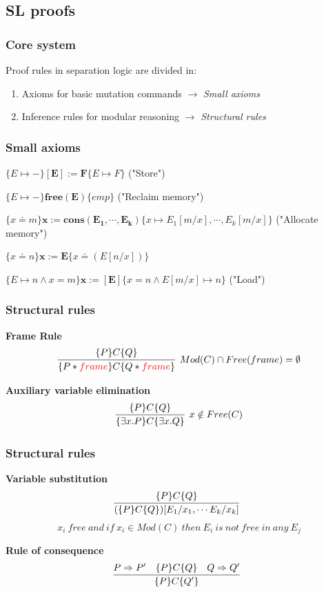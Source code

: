 \documentclass[professionalfont]{beamer}
\begin{document}
    \subsection{SL proofs}
        \begin{frame}
            \frametitle{Core system}
            Proof rules in separation logic  are divided in:\begin{enumerate}
                \item Axioms for basic mutation commands $\rightarrow$ \emph{Small axioms}
                \item Inference rules for modular reasoning $\rightarrow$ \emph{Structural rules}
            \end{enumerate}
        \end{frame}
        \begin{frame}
            \frametitle{Small axioms}
             
            \pause
            $\{E \mapsto - \}\mathbf{[E] := F}\{ E \mapsto F \} $ ("Store")
            
            \bigskip
            \pause
            $ \{E \mapsto -\} \mathbf{free(E)} \{emp\}$ ("Reclaim memory")
           
            \bigskip
            \pause 
            $ \{x\doteq m \}\mathbf{x:=cons(E_1,\cdots,E_k)} \{x \mapsto E_1[m/x],\cdots, E_k[m/x]\}$ ("Allocate memory")
            
            \bigskip
            \pause 
            $ \{x \doteq n\}\mathbf{x := E} \{ x \doteq (E[n/x])\}$ 
            
            \bigskip
            \pause 
            $ \{E \mapsto n \wedge  x = m\}\mathbf{x:=[E]} \{x=n \wedge E[m/x] \mapsto n\}$  ("Load")
    
           
        \end{frame}
        \begin{frame}
            \frametitle{Structural rules}
            \scriptsize
            \textbf{Frame Rule}
            $$
            \infer[Mod(C) \cap  Free(frame) = \emptyset]
            {\{P \ast \textcolor{red}{frame}\}C\{Q \ast \textcolor{red}{frame}\}}
            {\{P\}C\{Q\}}$$

            \pause
            \textbf{Auxiliary variable elimination}
            $$
            \infer[x \notin Free(C)]
            {\{\exists x.P\}C\{\exists x.Q\}}
            {\{P\}C\{Q\} }
            $$
        \end{frame}
        \begin{frame}
            \frametitle{Structural rules}
            \scriptsize
           \textbf{Variable substitution}
           $$
           \infer[]
           {(\{P\}C\{Q\})[E_1 / x_1, \cdots E_k /x_k] }
           {\{P\}C\{Q\} }$$
           $$
           x_i\ free\ and\ if\ x_i \in Mod(C)\ then\ E_i\ is\ not\ free\ in\ any\ E_j$$
           
           \pause
           \textbf{Rule of consequence}
            $$
            \infer[]
            {\{P\}C\{Q'\}}
            {P \Rightarrow P' \quad \{P\}C\{Q\} \quad Q \Rightarrow Q'}$$
        
        \end{frame}
\end{document}
